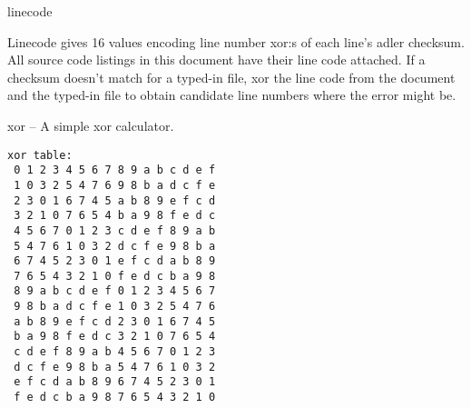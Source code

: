 \begin{algorithm}{linecode}

Linecode gives 16 values encoding line number xor:s of each line's adler
checksum. All source code listings in this document have their line code
attached. If a checksum doesn't match for a typed-in file, xor the line code
from the document and the typed-in file to obtain candidate line numbers where
the error might be.
\end{algorithm}

\begin{algorithm}{xor}
-- A simple xor calculator.
\end{algorithm}

\begin{sourceslandscape}
\end{sourceslandscape}
\begin{sourceslandscape}
  \begin{verbatim}
xor table:
 0 1 2 3 4 5 6 7 8 9 a b c d e f
 1 0 3 2 5 4 7 6 9 8 b a d c f e
 2 3 0 1 6 7 4 5 a b 8 9 e f c d
 3 2 1 0 7 6 5 4 b a 9 8 f e d c
 4 5 6 7 0 1 2 3 c d e f 8 9 a b
 5 4 7 6 1 0 3 2 d c f e 9 8 b a
 6 7 4 5 2 3 0 1 e f c d a b 8 9
 7 6 5 4 3 2 1 0 f e d c b a 9 8
 8 9 a b c d e f 0 1 2 3 4 5 6 7
 9 8 b a d c f e 1 0 3 2 5 4 7 6
 a b 8 9 e f c d 2 3 0 1 6 7 4 5
 b a 9 8 f e d c 3 2 1 0 7 6 5 4
 c d e f 8 9 a b 4 5 6 7 0 1 2 3
 d c f e 9 8 b a 5 4 7 6 1 0 3 2
 e f c d a b 8 9 6 7 4 5 2 3 0 1
 f e d c b a 9 8 7 6 5 4 3 2 1 0
  \end{verbatim}
\end{sourceslandscape}
